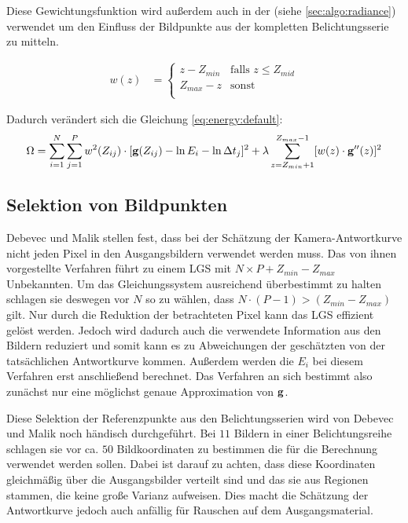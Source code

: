 Diese Gewichtungsfunktion wird außerdem auch in der  (siehe \autoref{sec:algo:radiance}) verwendet um den Einfluss der Bildpunkte aus der kompletten Belichtungsserie zu mitteln.

\begin{align}
\label{eq:w}
w(z) &= \begin{cases} 
z - Z_{min}&  \text{falls } z \leq Z_{mid}  \\ 
Z_{max}-z& \text{sonst}\\
\end{cases}
\end{align}

Dadurch verändert sich die Gleichung \autoref{eq:energy:default}:
\begin{equation}
\label{eq:energy:weights}
\Omega = \sum \limits_{i=1}^{N} \sum \limits_{j=1}^{P}w^2(Z_{ij})\cdot[\mathbf g(Z_{ij}) - \ln E_i - \ln \Delta t_j]^2 + \lambda  \sum \limits_{z=Z_{min}+1}^{Z_{max}-1} [w(z) \cdot \mathbf{g}''(z)]^2\\
\end{equation}

\subsection{Selektion von Bildpunkten}
\label{algo:schwachstellen:selektion}
Debevec und Malik stellen fest, dass bei der Schätzung der Kamera-Antwortkurve nicht jeden Pixel in den Ausgangsbildern verwendet werden muss. Das von ihnen vorgestellte Verfahren führt zu einem \gls{LGS} mit $N \times P + Z_{min} - Z_{max}$ Unbekannten. Um das Gleichungssystem ausreichend überbestimmt zu halten schlagen sie deswegen vor $N$ so zu wählen, dass $N\cdot(P-1) > (Z_{min}-Z_{max})$ gilt. Nur durch die Reduktion der betrachteten Pixel kann das \gls{LGS} effizient gelöst werden. Jedoch wird dadurch auch die verwendete Information aus den Bildern reduziert und somit kann es zu Abweichungen der geschätzten von der tatsächlichen Antwortkurve kommen. Außerdem werden die $E_i$ bei diesem Verfahren erst anschließend berechnet. Das Verfahren an sich bestimmt also zunächst nur eine möglichst genaue Approximation von $\mathbf g$. 

Diese Selektion der Referenzpunkte aus den Belichtungsserien wird von Debevec und Malik noch händisch durchgeführt. Bei $11$ Bildern in einer Belichtungsreihe schlagen sie vor ca. $50$ Bildkoordinaten zu bestimmen die für die Berechnung verwendet werden sollen. Dabei ist darauf zu achten, dass diese Koordinaten gleichmäßig über die Ausgangsbilder verteilt sind und das sie aus Regionen stammen, die keine große Varianz aufweisen. Dies macht die Schätzung der Antwortkurve jedoch auch anfällig für Rauschen auf dem Ausgangsmaterial.

